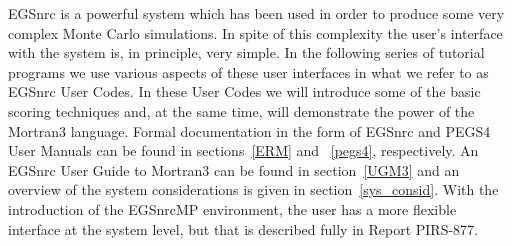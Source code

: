 
%
%
%
%
%
%
%
%
%


\vspace*{-3mm}

\label{tutorials}

EGSnrc is a powerful system which has been used in order to produce some
very complex Monte Carlo simulations.  In spite of this complexity the
user's interface with the system is, in principle, very simple.  In the
following series of tutorial programs we use various aspects of these
user interfaces in what we refer to as EGSnrc User Codes.  In these
User Codes we will introduce some of the basic scoring techniques and,
at the same time, will demonstrate the power of the Mortran3 language.
Formal documentation in the form of EGSnrc and PEGS4 User Manuals can be
found in sections~\ref{ERM} and ~\ref{pegs4}, respectively.  An EGSnrc
User Guide to Mortran3 can be found in section~\ref{UGM3} and an overview
of the system considerations is given in section~\ref{sys_consid}. With
the introduction of the EGSnrcMP environment, the user has a more
flexible interface at the system level, but that is described fully in
Report PIRS-877\cite{Ka03}.

